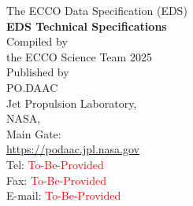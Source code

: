 \documentclass[letterpaper]{article}
\begin{document}
\pagebreak

\begin{center}
    \vspace*{2cm}
    {\Large The ECCO Data Specification (EDS)}\\[2cm]
    {\LARGE \textbf{EDS Technical Specifications}}\\[2cm]
    {\large Compiled by\\the ECCO Science Team 2025}\\[2cm]
    {\large Published by \\PO.DAAC\\
    Jet Propulsion Laboratory,\\
    NASA,\\
    Main Gate:\\
    \url{https://podaac.jpl.nasa.gov}}\\[2cm]
    {\large Tel: \textcolor{red}{To-Be-Provided}\\
    Fax: \textcolor{red}{To-Be-Provided}\\
    E-mail: \textcolor{red}{To-Be-Provided}}\\[2cm]
\end{center}



\end{document}

